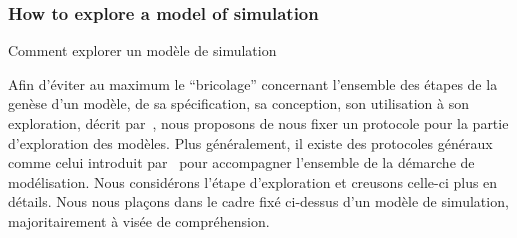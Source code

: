 





\subsubsection{How to explore a model of simulation}{Comment explorer un modèle de simulation}

Afin d'éviter au maximum le ``bricolage'' concernant l'ensemble des étapes de la genèse d'un modèle, de sa spécification, sa conception, son utilisation à son exploration, décrit par~\cite{bonhomme2017dictionnaire}, nous proposons de nous fixer un protocole pour la partie d'exploration des modèles. Plus généralement, il existe des protocoles généraux comme celui introduit par~\cite{grimm2014towards} pour accompagner l'ensemble de la démarche de modélisation. Nous considérons l'étape d'exploration et creusons celle-ci plus en détails. Nous nous plaçons dans le cadre fixé ci-dessus d'un modèle de simulation, majoritairement à visée de compréhension.


